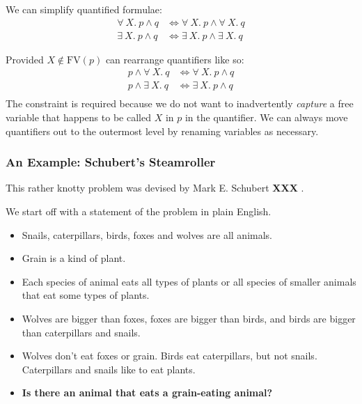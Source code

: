 \documentclass[a4paper,11pt,notitlepage,onecolumn]{article}
\newcommand{\XXX}[1]%
{{\small\textbf{XXX} \emph{#1}}}
\newcommand{\Conj}%
{\wedge}
\newcommand{\Eqv}%
{\Leftrightarrow}
\newcommand{\All}[2]%
{\forall\ #1.\ #2}
\newcommand{\Some}[2]%
{\exists\ #1.\ #2}
\newcommand{\FV}%
{\text{FV}}
\begin{document}
We can simplify quantified formulae:
\begin{align*}
\All{X}{p \Conj q}
& \Eqv \All{X}{p} \Conj \All{X}{q}\\
\Some{X}{p \Conj q}
& \Eqv \Some{X}{p} \Conj \Some{X}{q}
\end{align*}

Provided $X \notin \FV(p)$ can rearrange quantifiers like so:
\begin{align*}
p \Conj \All{X}{q}
& \Eqv \All{X}{p \Conj q} \\
p \Conj \Some{X}{q}
& \Eqv \Some{X}{p \Conj q} \\
\end{align*}
The constraint is required because we do not want to inadvertently
\emph{capture} a free variable that happens to be called $X$ in $p$ in
the quantifier.  We can always move quantifiers out to the outermost
level by renaming variables as necessary.

\subsubsection{An Example: Schubert's Steamroller}

This rather knotty problem was devised by Mark E. Schubert \XXX{}.

We start off with a statement of the problem in plain English.
\begin{itemize}
\item Snails, caterpillars, birds, foxes and wolves are all animals.
\item Grain is a kind of plant.
\item Each species of animal eats all types of plants
or all species of smaller animals that eat some types of plants.
\item Wolves are bigger than foxes, foxes are bigger than birds, and
birds are bigger than caterpillars and snails.
\item Wolves don't eat foxes or grain.  Birds eat caterpillars, but not snails.
Caterpillars and snails like to eat plants.
\item \textbf{Is there an animal that eats a grain-eating animal?}
\end{itemize}
\end{document}
